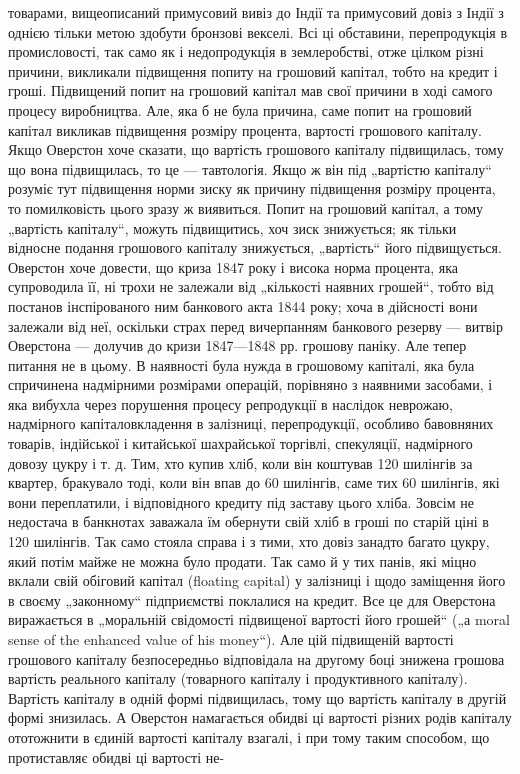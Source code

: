 товарами, вищеописаний примусовий вивіз до Індії та примусовий
довіз з Індії з однією тільки метою здобути бронзові векселі.
Всі ці обставини, перепродукція в промисловості, так само як
і недопродукція в землеробстві, отже цілком різні причини, викликали підвищення попиту на грошовий
капітал, тобто на кредит і гроші. Підвищений попит на грошовий капітал мав свої
причини в ході самого процесу виробництва. Але, яка б не була
причина, саме попит на грошовий капітал викликав підвищення
розміру процента, вартості грошового капіталу. Якщо Оверстон хоче сказати, що вартість грошового
капіталу підвищилась, тому що вона підвищилась, то це — тавтологія. Якщо ж
він під „вартістю капіталу“ розуміє тут підвищення норми зиску
як причину підвищення розміру процента, то помилковість цього
зразу ж виявиться. Попит на грошовий капітал, а тому „вартість капіталу“, можуть підвищитись, хоч
зиск знижується; як
тільки відносне подання грошового капіталу знижується, „вартість“ його підвищується. Оверстон хоче
довести, що криза 1847 року і висока норма процента, яка супроводила її, ні трохи
не залежали від „кількості наявних грошей“, тобто від постанов інспірованого ним банкового акта 1844
року; хоча в дійсності вони залежали від неї, оскільки страх перед вичерпанням
банкового резерву — витвір Оверстона — долучив до кризи 1847—1848 рр. грошову паніку. Але тепер
питання не в цьому.
В наявності була нужда в грошовому капіталі, яка була спричинена надмірними розмірами операцій,
порівняно з наявними засобами, і яка вибухла через порушення процесу репродукції в наслідок
неврожаю, надмірного капіталовкладення в залізниці, перепродукції, особливо бавовняних товарів,
індійської і китайської
шахрайської торгівлі, спекуляції, надмірного довозу цукру і т. д.
Тим, хто купив хліб, коли він коштував 120 шилінгів за квартер, бракувало тоді, коли він впав до 60
шилінгів, саме тих
60 шилінгів, які вони переплатили, і відповідного кредиту під
заставу цього хліба. Зовсім не недостача в банкнотах заважала
їм обернути свій хліб в гроші по старій ціні в 120 шилінгів.
Так само стояла справа і з тими, хто довіз занадто багато
цукру, який потім майже не можна було продати. Так само й
у тих панів, які міцно вклали свій обіговий капітал (floating capital)
у залізниці і щодо заміщення його в своєму „законному“ підприємстві поклалися на кредит. Все це для
Оверстона виражається в „моральній свідомості підвищеної вартості його грошей“ („а moral sense of
the enhanced value of his money“). Але цій
підвищеній вартості грошового капіталу безпосередньо відповідала на другому боці знижена грошова
вартість реального капіталу
(товарного капіталу і продуктивного капіталу). Вартість капіталу
в одній формі підвищилась, тому що вартість капіталу в другій
формі знизилась. А Оверстон намагається обидві ці вартості різних
родів капіталу ототожнити в єдиній вартості капіталу взагалі, і
при тому таким способом, що протиставляє обидві ці вартості не-
